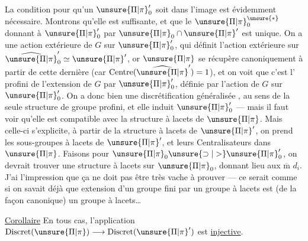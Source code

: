 
La condition pour qu'un  \(\unsure{\Pi|\pi}'_0\) soit dans
l'image est évidemment nécessaire. Montrons
qu'elle est suffisante, et que le \(\unsure{\Pi|\pi}_0^{\unsure{*}}\) donnant
 à \(\unsure{\Pi|\pi}'_0\) par \(\unsure{\Pi|\pi}_0\cap\unsure{\Pi|\pi}'\) est unique.
On a une action extérieure de \(G\) sur \(\unsure{\Pi|\pi}'_0\),
qui définit l'action extérieure sur \(\widehat{\unsure{\Pi|\pi}}'_0\simeq\unsure{\Pi|\pi}'\),
or \(\unsure{\Pi|\pi}\) se récupère canoniquement à partir de
cette dernière (car \(\mathrm{Centre}(\widehat{\unsure{\Pi|\pi}}')=1\)), et on
voit que c'est l'   profini de
l'extension  de \(G\) par \(\unsure{\Pi|\pi}'_0\), définie par l'action
 de \(G\) sur \(\unsure{\Pi|\pi}'_0\). On a donc bien une
discrétification généralisée , au sens de la
seule structure de  groupe profini, et elle
induit \(\unsure{\Pi|\pi}'_0\) --- mais il faut voir qu'elle
est compatible avec la structure à lacets de \(\unsure{\Pi|\pi}\).
Mais celle-ci s'explicite, à partir de la
structure à lacets de \(\unsure{\Pi|\pi}'\), on prend les
sous-groupes à lacets  de \(\unsure{\Pi|\pi}'\), et leurs
Centralisateurs dans \(\unsure{\Pi|\pi}\). Faisons  pour
\(\unsure{\Pi|\pi}_0\unsure{\supset|>}\unsure{\Pi|\pi}'_0\), on devrait trouver une structure
à lacets sur \(\unsure{\Pi|\pi}_0\), donnant lieu aux
\(\overline{\mathrm m}\) \(d_i\).
J'ai l'impression que ça ne
doit pas être très vache à prouver --- ce
serait comme si on savait déjà que 
extension  d'un groupe fini par un
groupe à lacets est (de la façon canonique)
un groupe à lacets\ldots

\uline{Corollaire} En tous cas, l'application
\(\mathrm{Discret}(\unsure{\Pi|\pi})\longrightarrow\mathrm{Discret}(\unsure{\Pi|\pi}')\)
est \uline{injective}.

